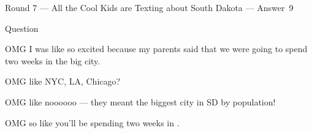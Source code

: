 \documentclass[11pt]{beamer}
\begin{document}
\begin{frame}[t]{Round 7 --- All the Cool Kids are Texting about South Dakota --- \mbox{Answer 9}}
\begin{block}{Question}

\begin{minipage}{0.9\textwidth}
\begin{mdframed}[
    roundcorner=7pt,
    backgroundcolor=black!5,
    linecolor=black!5,
    fontcolor=black,
    ignorelastdescenders]
\begin{flushleft}
{\small{}\selectfont{}
OMG I was like so excited because my parents said that we were going to spend two weeks in the big city.
}
\end{flushleft}
\end{mdframed}
\end{minipage}

\hfill{}\begin{minipage}{0.9\textwidth}
\begin{mdframed}[
    roundcorner=7pt,
    backgroundcolor=blue!80!white,
    linecolor=blue!80!white,
    fontcolor=white,
    ignorelastdescenders]
\begin{flushleft}
{\small{}\selectfont{}
OMG like NYC, LA, Chicago?
}
\end{flushleft}
\end{mdframed}
\end{minipage}

\begin{minipage}{0.9\textwidth}
\begin{mdframed}[
    roundcorner=7pt,
    backgroundcolor=black!5,
    linecolor=black!5,
    fontcolor=black,
    ignorelastdescenders]
\begin{flushleft}
{\small{}\selectfont{}
OMG like noooooo --- they meant the biggest city in SD by population!
}
\end{flushleft}
\end{mdframed}
\end{minipage}

\hfill{}\begin{minipage}{0.9\textwidth}
\begin{mdframed}[
    roundcorner=7pt,
    backgroundcolor=blue!80!white,
    linecolor=blue!80!white,
    fontcolor=white,
    ignorelastdescenders]
\begin{flushleft}
{\small{}\selectfont{}
OMG so like you'll be spending two weeks in \textunderscore{}\textunderscore{}\textunderscore{}\textunderscore{}\textunderscore{}\textunderscore{} \textunderscore{}\textunderscore{}\textunderscore{}\textunderscore{}\textunderscore{}\textunderscore{}.
}
\end{flushleft}
\end{mdframed}
\end{minipage}
\end{block}
\end{frame}
\end{document}
